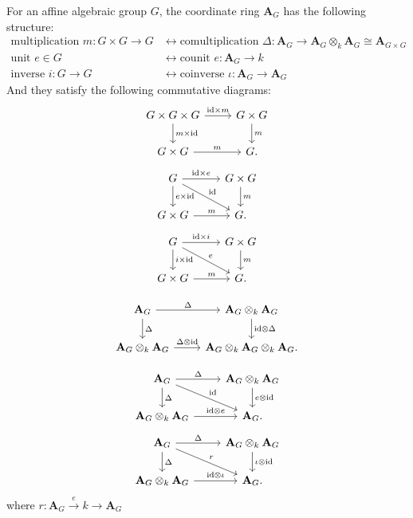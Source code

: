 \begin{corollary}
	For an affine algebraic group $G$, the coordinate ring $\mathbf{A}_G$ has the following structure:\\
	\begin{align*}
		\mbox{multiplication } m\colon G\times G\longrightarrow G & \longleftrightarrow \mbox{comultiplication } \Delta: \mathbf{A}_G \longrightarrow \mathbf{A}_G \otimes_k \mathbf{A}_G \cong \mathbf{A}_{G\times G}\\
		\mbox{unit } e\in G & \longleftrightarrow \mbox{counit } e \colon \mathbf{A}_G \longrightarrow k\\
		\mbox{inverse } i\colon G\longrightarrow G & \longleftrightarrow  \mbox{coinverse } \iota \colon \mathbf{A}_G \longrightarrow \mathbf{A}_G
	\end{align*}
	And they satisfy the following commutative diagrams:
	\[\begin{tikzcd}
  G\times G\times G \ar[r, "\id\times m"] \ar[d, "m\times \id"] 
    & G\times G \ar[d, "m"] \\ 
  G\times G \ar[r, "m"] 
    & G .
\end{tikzcd}\]
	\[\begin{tikzcd}
  G \ar[r, "\id\times e"] \ar[d, "e\times \id"] \ar[rd, "\id"]
    & G\times G \ar[d, "m"] \\ 
  G\times G \ar[r, "m"] 
    & G .
\end{tikzcd}\]
	\[\begin{tikzcd}
  G \ar[r, "\id \times i"] \ar[d, "i \times \id"] \ar[rd, "e"]
    & G\times G \ar[d, "m"] \\ 
  G\times G \ar[r, "m"] 
    & G .
\end{tikzcd}\]


\[\begin{tikzcd}
  \mathbf{A}_G \ar[r, "\Delta"] \ar[d, "\Delta"] 
    & \mathbf{A}_G\otimes_k \mathbf{A}_G \ar[d, "\id\otimes \Delta"] \\
  \mathbf{A}_G\otimes_k \mathbf{A}_G \ar[r, "\Delta\otimes \id"] 
    & \mathbf{A}_G\otimes_k \mathbf{A}_G\otimes_k \mathbf{A}_G .
\end{tikzcd}\]

\[\begin{tikzcd}
  \mathbf{A}_G \ar[r, "\Delta"] \ar[d, "\Delta"] \ar[rd, "\id"]
    & \mathbf{A}_G\otimes_k \mathbf{A}_G \ar[d, "e\otimes \id"] \\
  \mathbf{A}_G\otimes_k \mathbf{A}_G \ar[r, "\id\otimes e"] 
    & \mathbf{A}_G.
\end{tikzcd}\]
\[\begin{tikzcd}
  \mathbf{A}_G \ar[r, "\Delta"] \ar[d, "\Delta"] \ar[rd, "r"]
    & \mathbf{A}_G\otimes_k \mathbf{A}_G \ar[d, "\iota \otimes \id"] \\
  \mathbf{A}_G\otimes_k \mathbf{A}_G \ar[r, "\id\otimes \iota "] 
    & \mathbf{A}_G.
\end{tikzcd}\]
where $r\colon \mathbf{A}_G \overset{e}\longrightarrow k \longrightarrow \mathbf{A}_G$
\end{corollary}
